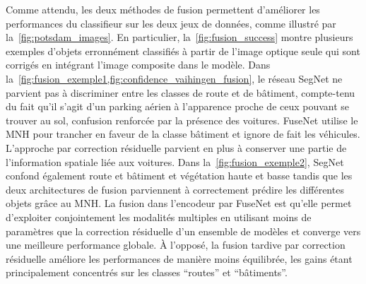Comme attendu, les deux méthodes de fusion permettent d'améliorer les performances du classifieur sur les deux jeux de données, comme illustré par la~\cref{fig:potsdam_images}. En particulier, la~\cref{fig:fusion_success} montre plusieurs exemples d'objets erronnément classifiés à partir de l'image optique seule qui sont corrigés en intégrant l'image composite dans le modèle. Dans la~\cref{fig:fusion_exemple1,fig:confidence_vaihingen_fusion}, le réseau SegNet ne parvient pas à discriminer entre les classes de route et de bâtiment, compte-tenu du fait qu'il s'agit d'un parking aérien à l'apparence proche de ceux pouvant se trouver au sol, confusion renforcée par la présence des voitures. FuseNet utilise le \gls{MNH} pour trancher en faveur de la classe bâtiment et ignore de fait les véhicules. L'approche par correction résiduelle parvient en plus à conserver une partie de l'information spatiale liée aux voitures. Dans la~\cref{fig:fusion_exemple2}, SegNet confond également route et bâtiment et végétation haute et basse tandis que les deux architectures de fusion parviennent à correctement prédire les différentes objets grâce au \gls{MNH}.
La fusion dans l'encodeur par FuseNet est qu'elle permet d'exploiter conjointement les modalités multiples en utilisant moins de paramètres que la correction résiduelle d'un ensemble de modèles et converge vers une meilleure performance globale. À l'opposé, la fusion tardive par correction résiduelle améliore les performances de manière moins équilibrée, les gains étant principalement concentrés sur les classes ``routes'' et ``bâtiments''.

